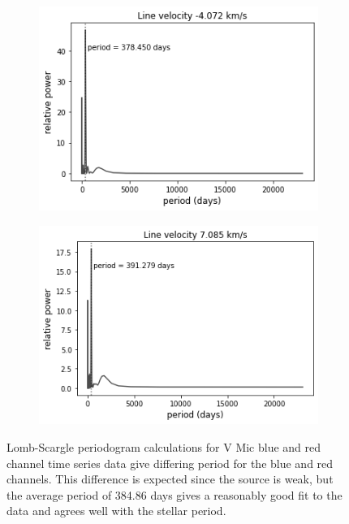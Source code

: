 \begin{figure}
\centering
  \begin{subfigure}{0.5\hsize}
    \includegraphics[width=0.99\hsize]{images/VMic_blue_-4.072_periodogram.png}
  \end{subfigure}%
  \hfill
  \begin{subfigure}{0.5\hsize}
    \includegraphics[width=0.99\hsize]{images/VMic_red_7.085_periodogram.png}
  \end{subfigure}%
\caption{\label{fig:vmicperiod}Lomb-Scargle periodogram calculations for V Mic blue and red channel time series data give differing period for the blue and red channels. This difference is expected since the source is weak, but the average period of 384.86 days gives a reasonably good fit to the data and agrees well with the stellar period.}
\end{figure}

